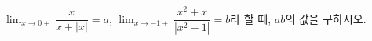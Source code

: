 $\displaystyle\lim_{x\to 0+}\dfrac{x}{x+|x|}=a$, $\displaystyle\lim_{x\to -1+}\dfrac{x^2+x}{|x^2-1|}=b$라 할 때, $ab$의 값을 구하시오.
